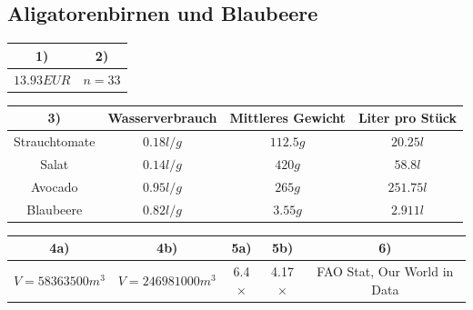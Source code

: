 \documentclass[a4paper, 9pt]{scrartcl}\usepackage[]{graphicx}\usepackage[]{xcolor}
\newenvironment{knitrout}{}{} %
\begin{document}
\subsection*{Aligatorenbirnen und Blaubeere}
\begin{knitrout}
\color{fgcolor}\begin{table}[!h]
\centering\begingroup\fontsize{10}{12}\selectfont

\begin{tabular}{cc}
\toprule
\textbf{1)} & \textbf{2)}\\
\midrule
$13.93EUR$ & $n = 33$\\
\bottomrule
\end{tabular}
\endgroup{}
\end{table}

\begin{table}[!h]
\centering\begingroup\fontsize{10}{12}\selectfont

\begin{tabular}{cccc}
\toprule
\textbf{3)} & \textbf{Wasserverbrauch} & \textbf{Mittleres Gewicht} & \textbf{Liter pro Stück}\\
\midrule
Strauchtomate & $0.18l/g$ & $112.5g$ & $20.25l$\\
Salat & $0.14l/g$ & $420g$ & $58.8l$\\
Avocado & $0.95l/g$ & $265g$ & $251.75l$\\
Blaubeere & $0.82l/g$ & $3.55g$ & $2.911l$\\
\bottomrule
\end{tabular}
\endgroup{}
\end{table}

\begin{table}[!h]
\centering\begingroup\fontsize{10}{12}\selectfont

\begin{tabular}{ccccc}
\toprule
\textbf{4a)} & \textbf{4b)} & \textbf{5a)} & \textbf{5b)} & \textbf{6)}\\
\midrule
$V = 58363500m^3$ & $V = 246981000m^3$ & 6.4$\times$ & 4.17$\times$ & FAO Stat, Our World in Data\\
\bottomrule
\end{tabular}
\endgroup{}
\end{table}

\end{knitrout}
\end{document}
